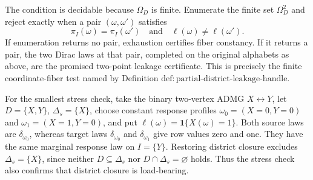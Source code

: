 The condition is decidable because \(\Omega_D\) is finite. Enumerate the finite set \(\Omega_D^2\) and reject exactly when a pair \((\omega,\omega')\) satisfies
\[
\pi_I(\omega)=\pi_I(\omega')
\quad\text{and}\quad
\ell(\omega)\ne\ell(\omega').
\tag{12}
\]
If enumeration returns no pair, exhaustion certifies fiber constancy. If it returns a pair, the two Dirac laws at that pair, completed on the original alphabets as above, are the promised two-point leakage certificate. This is precisely the finite coordinate-fiber test named by Definition \(\mathrm{def:partial\text{-}district\text{-}leakage\text{-}handle}\).

For the smallest stress check, take the binary two-vertex ADMG \(X\leftrightarrow Y\), let \(D=\{X,Y\}\), \(\Delta_s=\{X\}\), choose constant response profiles \(\omega_0=(X=0,Y=0)\) and \(\omega_1=(X=1,Y=0)\), and put \(\ell(\omega)=\mathbf 1\{X(\omega)=1\}\). Both source laws are \(\delta_{\omega_0}\), whereas target laws \(\delta_{\omega_0}\) and \(\delta_{\omega_1}\) give row values zero and one. They have the same marginal response law on \(I=\{Y\}\). Restoring district closure excludes \(\Delta_s=\{X\}\), since neither \(D\subseteq\Delta_s\) nor \(D\cap\Delta_s=\varnothing\) holds. Thus the stress check also confirms that district closure is load-bearing.